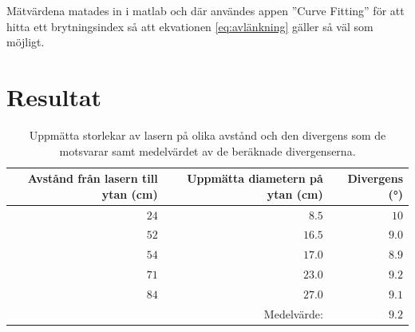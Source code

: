 \documentclass[a4paper]{article}
\begin{document}
  Mätvärdena matades in i matlab och där användes appen ”Curve Fitting” för att hitta ett brytningsindex så att ekvationen \eqref{eq:avlänkning} gäller så väl som möjligt.

\section{Resultat}

\FloatBarrier

\begin{table}[h]
	\centering
	\caption{Uppmätta storlekar av lasern på olika avstånd och den divergens som de motsvarar samt medelvärdet av de beräknade divergenserna.}
	\label{tab:div}
	\begin{tabular}{|rrr|}%
		\hline
		Avstånd från lasern till ytan (\si{\centi\meter}) & Uppmätta diametern på ytan (\si{\centi\meter}) & Divergens (\si{\degree}) \\
		\hline
		$24$ & $8.5$ & $10$ \\
		$52$ & $16.5$ & $9.0$ \\
		$54$ & $17.0$ & $8.9$ \\
		$71$ & $23.0$ & $9.2$ \\
		$84$ & $27.0$ & $9.1$ \\\hline
		& Medelvärde: & $9.2$ \\\hline
	\end{tabular}
\end{table}
\end{document}
